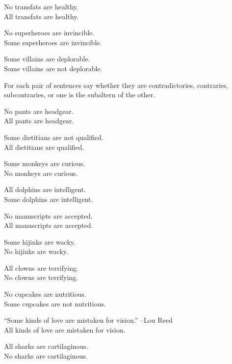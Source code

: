 \begin{exercises}
\item No transfats are healthy.  \\
	All transfats are healthy.  \answer{\\Contraries}

\item No superheroes are invincible.   \\
	Some superheroes are invincible. \answer{\\Contradictories}

\item Some villains are deplorable.  \\
	Some villains are not deplorable.  \answer{\\Subcontraries}

\end{exercises}

\noindent \problempart For each pair of sentences say whether they are contradictories, contraries, subcontraries, or one is the subaltern of the other.

\begin{exercises}
\item No pants are headgear. \\
	All pants are headgear.
\item Some dietitians are not qualified. \\
	All dietitians are qualified.
\item Some monkeys are curious. \\
	No monkeys are curious.
\item All dolphins are intelligent. \\
	Some dolphins are intelligent.
\item No manuscripts are accepted. \\
	All manuscripts are accepted.
\item Some hijinks are wacky. \\
	No hijinks are wacky.
\item All clowns are terrifying. \\
	No clowns are terrifying.
\item No cupcakes are nutritious. \\
	Some cupcakes are not nutritious.
\item ``Some kinds of love are mistaken for vision.'' --Lou Reed \\
	All kinds of love are mistaken for vision.
\item All sharks are cartilaginous. \\
	No sharks are cartilaginous.
\end{exercises}

